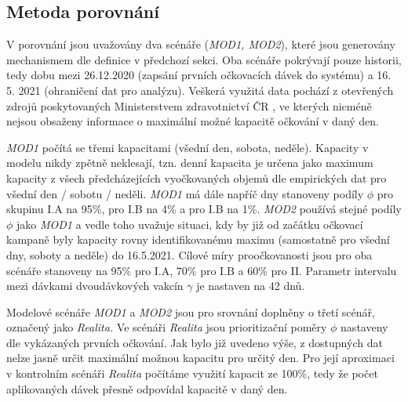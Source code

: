 \subsection*{Metoda porovnání}
\label{sec:comparison}
V porovnání jsou uvažovány dva scénáře (\emph{MOD1, MOD2}), které  jsou generovány mechanismem dle definice v předchozí sekci. Oba scénáře pokrývají pouze historii, tedy dobu mezi 26.12.2020 (zapsání prvních očkovacích dávek do systému) a 16. 5. 2021 (ohraničení dat pro analýzu).
Veškerá využitá data pochází z otevřených zdrojů poskytovaných Ministerstvem zdravotnictví ČR \cite{mzcr_data}, ve kterých nicméně nejsou obsaženy informace o maximální možné kapacitě očkování v daný den. 





\emph{MOD1} počítá se třemi kapacitami (všední den, sobota, neděle). Kapacity v modelu nikdy zpětně neklesají, tzn. denní kapacita je určena jako maximum kapacity z %
všech předcházejících vyočkovaných objemů dle empirických dat pro všední den / sobotu / neděli. \emph{MOD1} má dále napříč dny stanoveny podíly $\phi$ pro skupinu I.A na 95\%, pro I.B na 4\% a pro I.B na 1\%.
%
\emph{MOD2} používá stejné podíly  $\phi$ jako \emph{MOD1} a vedle toho uvažuje situaci, kdy by již od začátku očkovací kampaně byly kapacity rovny identifikovanému maximu (samostatně pro všední dny, soboty a neděle) do 16.5.2021. 
%
Cílové míry proočkovanosti jsou pro oba scénáře stanoveny na 95\% pro I.A, 70\% pro I.B a 60\% pro II. Parametr intervalu mezi dávkami dvoudávkových vakcín $\gamma$ je nastaven na 42 dnů.


Modelové scénáře \emph{MOD1} a \emph{MOD2} jsou pro srovnání doplněny o třetí scénář, označený jako \emph{Realita.}  Ve scénáři \emph{Realita} jsou prioritizační poměry $\phi$ nastaveny dle vykázaných prvních očkování. Jak bylo již uvedeno výše, z dostupných dat nelze jasně určit maximální možnou kapacitu pro určitý den. Pro její aproximaci v kontrolním scénáři \emph{Realita} počítáme využití kapacit ze 100\%, tedy že počet aplikovaných dávek přesně odpovídal kapacitě v daný den.




